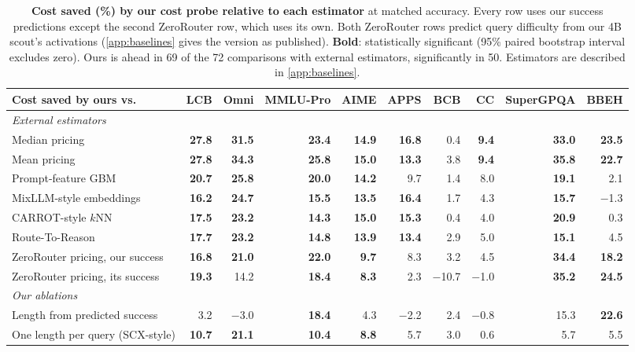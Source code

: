 \documentclass[10pt]{article}
\begin{document}
\begin{table}[t]
\centering
\footnotesize
\setlength{\tabcolsep}{3.5pt}
\begin{tabular}{lrrrrrrrrr}
\toprule
Cost saved by ours vs. & LCB & Omni & MMLU-Pro & AIME & APPS & BCB & CC & SuperGPQA & BBEH \\
\midrule
\emph{External estimators} \\
Median pricing & \textbf{27.8} & \textbf{31.5} & \textbf{23.4} & \textbf{14.9} & \textbf{16.8} & 0.4 & \textbf{9.4} & \textbf{33.0} & \textbf{23.5} \\
Mean pricing & \textbf{27.8} & \textbf{34.3} & \textbf{25.8} & \textbf{15.0} & \textbf{13.3} & 3.8 & \textbf{9.4} & \textbf{35.8} & \textbf{22.7} \\
Prompt-feature GBM & \textbf{20.7} & \textbf{25.8} & \textbf{20.0} & \textbf{14.2} & 9.7 & 1.4 & 8.0 & \textbf{19.1} & 2.1 \\
MixLLM-style embeddings & \textbf{16.2} & \textbf{24.7} & \textbf{15.5} & \textbf{13.5} & \textbf{16.4} & 1.7 & 4.3 & \textbf{15.7} & $-$1.3 \\
CARROT-style $k$NN & \textbf{17.5} & \textbf{23.2} & \textbf{14.3} & \textbf{15.0} & \textbf{15.3} & 0.4 & 4.0 & \textbf{20.9} & 0.3 \\
Route-To-Reason & \textbf{17.7} & \textbf{23.2} & \textbf{14.8} & \textbf{13.9} & \textbf{13.4} & 2.9 & 5.0 & \textbf{15.1} & 4.5 \\
ZeroRouter pricing, our success & \textbf{16.8} & \textbf{21.0} & \textbf{22.0} & \textbf{9.7} & 8.3 & 3.2 & 4.5 & \textbf{34.4} & \textbf{18.2} \\
ZeroRouter pricing, its success & \textbf{19.3} & 14.2 & \textbf{18.4} & \textbf{8.3} & 2.3 & $-$10.7 & $-$1.0 & \textbf{35.2} & \textbf{24.5} \\
\midrule
\emph{Our ablations} \\
Length from predicted success & 3.2 & $-$3.0 & \textbf{18.4} & 4.3 & $-$2.2 & 2.4 & $-$0.8 & 15.3 & \textbf{22.6} \\
One length per query (SCX-style) & \textbf{10.7} & \textbf{21.1} & \textbf{10.4} & \textbf{8.8} & 5.7 & 3.0 & 0.6 & 5.7 & 5.5 \\
\bottomrule
\end{tabular}
\caption{\textbf{Cost saved (\%) by our cost probe relative to each estimator} at matched accuracy. Every row uses our success predictions except the second ZeroRouter row, which uses its own. Both ZeroRouter rows predict query difficulty from our 4B scout's activations (\cref{app:baselines} gives the version as published). \textbf{Bold}: statistically significant (95\% paired bootstrap interval excludes zero). Ours is ahead in 69 of the 72 comparisons with external estimators, significantly in 50. Estimators are described in \cref{app:baselines}.}
\label{tab:allest}
\end{table}
\end{document}
